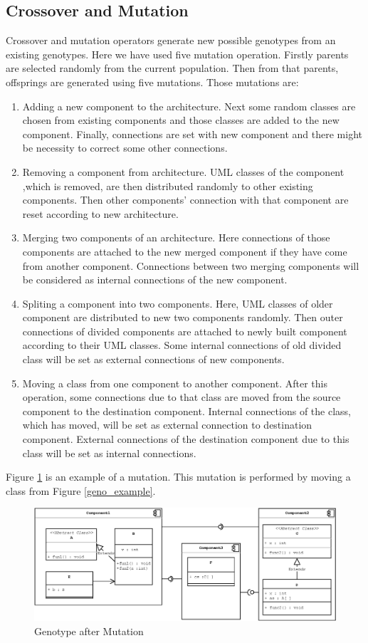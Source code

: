 \documentclass[letterpaper, 10 pt, conference]{ieeeconf}  %
\begin{document}
\subsection{Crossover and Mutation}
Crossover and mutation operators generate new possible genotypes from an existing genotypes. Here we have used five mutation operation. Firstly parents are selected randomly from the current population. Then from that parents, offsprings are generated using five mutations. Those mutations are:
\begin{enumerate}
\item Adding a new component to the architecture. Next some random classes are chosen from existing components and those classes are added to the new component. Finally, connections are set with new component and there might be necessity to correct some other connections.
\item Removing a component from architecture. UML classes of the component ,which is removed, are then distributed randomly to other existing components. Then other components' connection with that component are reset according to new architecture.
\item Merging two components of an architecture. Here connections of those components are attached to the new merged component if they have come from another component. Connections between two merging components will be considered as internal connections of the new component.
\item Spliting a component into two components. Here, UML classes of older component are distributed to new two components randomly. Then outer connections of divided components are attached to newly built component according to their UML classes. Some internal connections of old divided class will be set as external connections of new components.
\item Moving a class from one component to another component.  After this operation, some connections due to that class are moved from the source component to the destination component. Internal connections of the class, which has moved, will be set as external connection to destination component. External connections of the destination component due to this class will be set as internal connections.

\end{enumerate}
Figure \ref{mutation} is an example of a mutation. This mutation is performed by moving a class from Figure \ref{geno_example}. 
\begin{figure} [!h] \label{mutation}
  \includegraphics[width=\linewidth]{phenotype_cross.eps}
  \caption{Genotype after Mutation}
\end{figure} 
\end{document}
